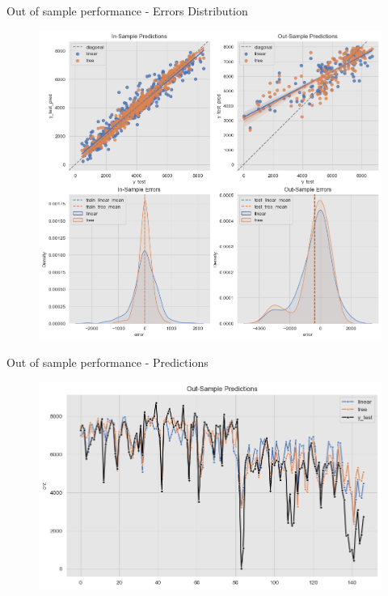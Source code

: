\documentclass[10pt]{beamer}
\begin{document}
\begin{frame}{Out of sample performance - Errors Distribution}
\begin{center}
  \begin{figure}
    \includegraphics[scale=0.35]{images/interpretable_ml_45_0.png} 
  \end{figure}
\end{center}
\end{frame}

\begin{frame}{Out of sample performance - Predictions}
\begin{center}
  \begin{figure}
    \includegraphics[scale=0.45]{images/interpretable_ml_48_0.png} 
  \end{figure}
\end{center}
\end{frame}
\end{document}
